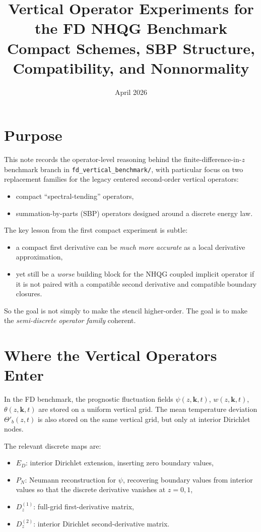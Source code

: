 \documentclass[11pt]{article}
\title{\textbf{Vertical Operator Experiments for the FD NHQG Benchmark}\\[8pt]
\large Compact Schemes, SBP Structure, Compatibility, and Nonnormality}
\author{}
\date{April 2026}
\newcommand{\Dzone}{D^{(1)}_z}
\newcommand{\Dztwo}{D^{(2)}_z}
\newcommand{\Emat}{E_D}
\newcommand{\Pmat}{P_N}
\begin{document}
\maketitle
\vspace{0.5em}

\section{Purpose}

This note records the operator-level reasoning behind the finite-difference-in-$z$
benchmark branch in \texttt{fd\_vertical\_benchmark/}, with particular focus on
two replacement families for the legacy centered second-order vertical
operators:
\begin{itemize}[nosep]
\item compact ``spectral-tending'' operators,
\item summation-by-parts (SBP) operators designed around a discrete energy law.
\end{itemize}

The key lesson from the first compact experiment is subtle:
\begin{itemize}[nosep]
\item a compact first derivative can be \emph{much more accurate} as a local
  derivative approximation,
\item yet still be a \emph{worse} building block for the NHQG coupled implicit
  operator if it is not paired with a compatible second derivative and
  compatible boundary closures.
\end{itemize}

So the goal is not simply to make the stencil higher-order. The goal is to make
the \emph{semi-discrete operator family} coherent.

\section{Where the Vertical Operators Enter}

In the FD benchmark, the prognostic fluctuation fields
$\psi(z,\bm{k},t)$, $w(z,\bm{k},t)$, $\theta(z,\bm{k},t)$ are stored on a
uniform vertical grid. The mean temperature deviation $\Theta'_b(z,t)$ is also
stored on the same vertical grid, but only at interior Dirichlet nodes.

The relevant discrete maps are:
\begin{itemize}[nosep]
\item $\Emat$: interior Dirichlet extension, inserting zero boundary values,
\item $\Pmat$: Neumann reconstruction for $\psi$, recovering boundary values
  from interior values so that the discrete derivative vanishes at $z=0,1$,
\item $\Dzone$: full-grid first-derivative matrix,
\item $\Dztwo$: interior Dirichlet second-derivative matrix.
\end{itemize}
\end{document}
